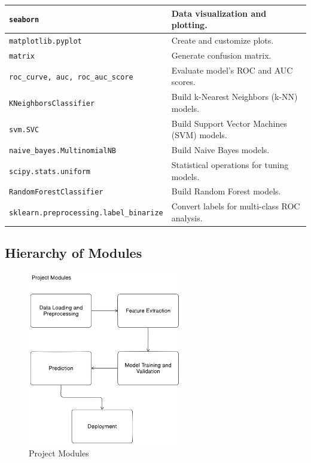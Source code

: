 \begin{table}[h!]
\begin{tabular}{|p{9cm}|p{6cm}|}
  \hline
  \texttt{seaborn} & Data visualization and plotting. \\
  
  \hline
  \texttt{matplotlib.pyplot} & Create and customize plots. \\
  
  \hline
  \texttt{matrix} & Generate confusion matrix. \\
  
  \hline
  \texttt{roc\_curve, auc, roc\_auc\_score} & Evaluate model’s ROC and AUC scores. \\
  
  \hline
  \texttt{KNeighborsClassifier} & Build k-Nearest Neighbors (k-NN) models. \\
  
  \hline
  \texttt{svm.SVC} & Build Support Vector Machines (SVM) models. \\
  
  \hline
  \texttt{naive\_bayes.MultinomialNB} & Build Naive Bayes models. \\
  
  \hline
  \texttt{scipy.stats.uniform} & Statistical operations for tuning models. \\
  
  \hline
  \texttt{RandomForestClassifier} & Build Random Forest models. \\
  
  \hline
  \texttt{sklearn.preprocessing.label\_binarize} & Convert labels for multi-class ROC analysis. \\
  
  \hline
\end{tabular}
\end{table}



\pagebreak

\subsection{Hierarchy of Modules}
\begin{figure}[h!]  
    \centering
    \includegraphics[width=0.6\textwidth]{Images/Project Modules.png}  
    \caption{Project Modules}
    \label{Project Modules}  %
\end{figure}

